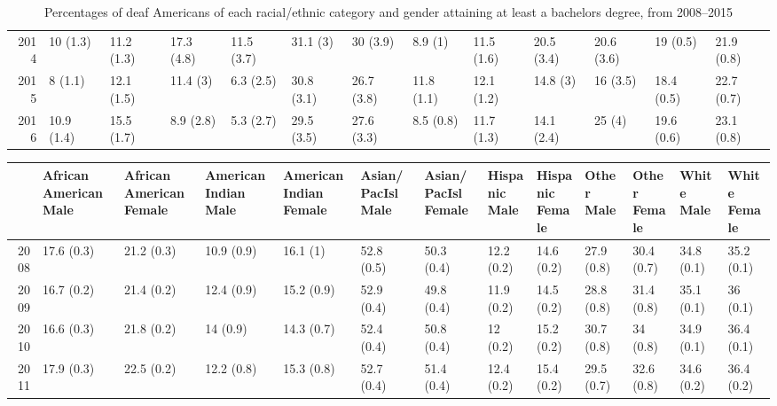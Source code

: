 \documentclass{article}\usepackage[]{graphicx}\usepackage[]{color}
\begin{document}
\begin{landscape}
\begin{table}[ht]
\begin{tabular}{rllllllllllll}
  2014 & 10 (1.3) & 11.2 (1.3) & 17.3 (4.8) & 11.5 (3.7) & 31.1 (3) & 30 (3.9) & 8.9 (1) & 11.5 (1.6) & 20.5 (3.4) & 20.6 (3.6) & 19 (0.5) & 21.9 (0.8) \\
  2015 & 8 (1.1) & 12.1 (1.5) & 11.4 (3) & 6.3 (2.5) & 30.8 (3.1) & 26.7 (3.8) & 11.8 (1.1) & 12.1 (1.2) & 14.8 (3) & 16 (3.5) & 18.4 (0.5) & 22.7 (0.7) \\
  2016 & 10.9 (1.4) & 15.5 (1.7) & 8.9 (2.8) & 5.3 (2.7) & 29.5 (3.5) & 27.6 (3.3) & 8.5 (0.8) & 11.7 (1.3) & 14.1 (2.4) & 25 (4) & 19.6 (0.6) & 23.1 (0.8) \\
   \hline
\end{tabular}
\caption{Percentages of deaf Americans of each racial/ethnic category and gender attaining at least a bachelors degree, from 2008--2015}
\end{table}
\begin{table}[ht]
\centering
\begin{tabular}{rllllllllllll}
  \hline
 & \thead{African American\\Male} & \thead{African American\\Female} & \thead{American Indian\\Male} & \thead{American Indian\\Female} & \thead{Asian/PacIsl\\Male} & \thead{Asian/PacIsl\\Female} & \thead{Hispanic\\Male} & \thead{Hispanic\\Female} & \thead{Other\\Male} & \thead{Other\\Female} & \thead{White\\Male} & \thead{White\\Female} \\
  \hline
2008 & 17.6 (0.3) & 21.2 (0.3) & 10.9 (0.9) & 16.1 (1) & 52.8 (0.5) & 50.3 (0.4) & 12.2 (0.2) & 14.6 (0.2) & 27.9 (0.8) & 30.4 (0.7) & 34.8 (0.1) & 35.2 (0.1) \\
  2009 & 16.7 (0.2) & 21.4 (0.2) & 12.4 (0.9) & 15.2 (0.9) & 52.9 (0.4) & 49.8 (0.4) & 11.9 (0.2) & 14.5 (0.2) & 28.8 (0.8) & 31.4 (0.8) & 35.1 (0.1) & 36 (0.1) \\
  2010 & 16.6 (0.3) & 21.8 (0.2) & 14 (0.9) & 14.3 (0.7) & 52.4 (0.4) & 50.8 (0.4) & 12 (0.2) & 15.2 (0.2) & 30.7 (0.8) & 34 (0.8) & 34.9 (0.1) & 36.4 (0.1) \\
  2011 & 17.9 (0.3) & 22.5 (0.2) & 12.2 (0.8) & 15.3 (0.8) & 52.7 (0.4) & 51.4 (0.4) & 12.4 (0.2) & 15.4 (0.2) & 29.5 (0.7) & 32.6 (0.8) & 34.6 (0.2) & 36.4 (0.2) \\

\end{tabular}
\end{table}
\end{landscape}
\end{document}
